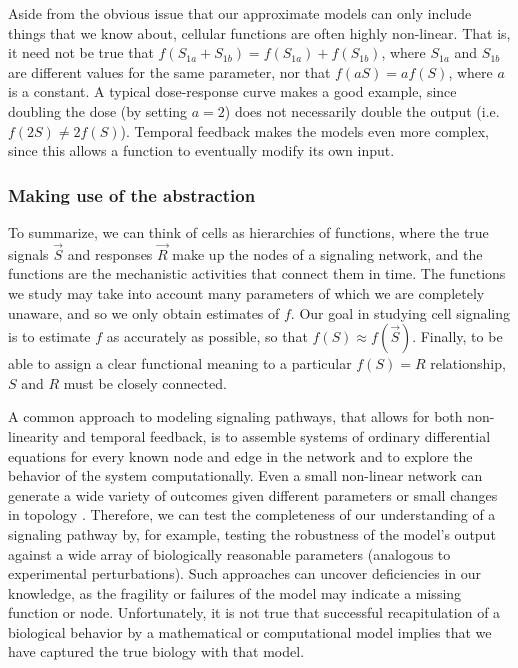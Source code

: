 Aside from the obvious issue that our approximate
models can only include things that we know about, cellular functions are often highly
non-linear. That is, it need not be true that $f(S_{1a}+S_{1b})=f(S_{1a})+f(S_{1b})$,
where $S_{1a}$ and $S_{1b}$ are different values for the same parameter,
nor that $f(aS)=af(S)$, where $a$ is a constant. A typical dose-response
curve makes a good example, since doubling the dose
(by setting $a=2$) does not necessarily double the output (i.e. $f(2S)\neq 2f(S)$).
Temporal feedback makes the models even more complex, since this 
allows a function to eventually modify its own input.
	

\subsubsection{Making use of the abstraction}


To summarize, we can think of cells as
hierarchies of functions, where the true signals $\vec{S}$ and responses $\vec{R}$
make up the nodes
of a signaling network, and the functions are the mechanistic activities that
connect them in time. The functions we study may take into account
many parameters of which we are completely unaware, and so we only obtain
estimates of $f$. Our goal in studying cell signaling is to estimate $f$
as accurately as possible, so that $f(S)\approx f(\vec{S})$.
Finally, to be able to assign a clear functional meaning to
a particular $f(S)=R$ relationship,
$S$ and $R$ must be closely connected.


A common approach to modeling signaling pathways,
that allows for both non-linearity and temporal feedback, is to assemble systems
of ordinary differential equations for
every known node and edge in the network and to explore the behavior
of the system computationally. Even a small non-linear network
can generate a wide variety of outcomes given different parameters
or small changes in topology
\cite{Shoval2010a,Wang2013b,Goentoro2009,Kholodenko2006}. Therefore, we can test
the completeness of our understanding of a signaling pathway by, for example,
testing the robustness of the model's output
against a wide array of biologically reasonable parameters (analogous to experimental
perturbations). Such approaches can
uncover deficiencies in our knowledge, as the fragility or
failures of the model may indicate a missing function or node.
Unfortunately, it is not true that successful recapitulation of a biological behavior by a
mathematical or computational model implies that we have captured
the true biology with that model.


